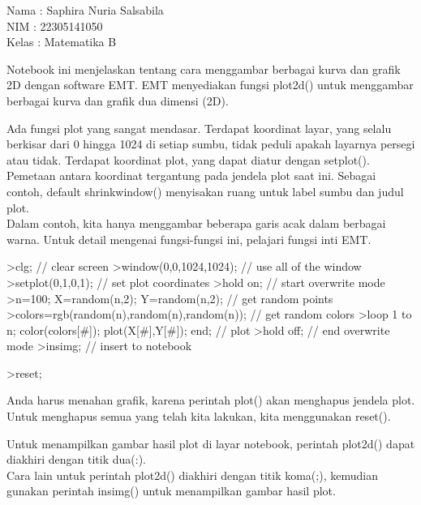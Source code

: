\documentclass{article}
\begin{document}
\begin{eulernotebook}
\begin{eulercomment}
Nama  : Saphira Nuria Salsabila\\
NIM   : 22305141050\\
Kelas : Matematika B


\begin{eulercomment}
\begin{eulercomment}
Notebook ini menjelaskan tentang cara menggambar berbagai kurva dan
grafik 2D dengan software EMT. EMT menyediakan fungsi plot2d() untuk
menggambar berbagai kurva dan grafik dua dimensi (2D).

\end{eulercomment}
\begin{eulercomment}
Ada fungsi plot yang sangat mendasar. Terdapat koordinat layar, yang
selalu berkisar dari 0 hingga 1024 di setiap sumbu, tidak peduli
apakah layarnya persegi atau tidak. Terdapat koordinat plot, yang
dapat diatur dengan setplot(). Pemetaan antara koordinat tergantung
pada jendela plot saat ini. Sebagai contoh, default shrinkwindow()
menyisakan ruang untuk label sumbu dan judul plot.\\
Dalam contoh, kita hanya menggambar beberapa garis acak dalam berbagai
warna. Untuk detail mengenai fungsi-fungsi ini, pelajari fungsi inti
EMT.
\end{eulercomment}
\begin{eulerprompt}
>clg; // clear screen
>window(0,0,1024,1024); // use all of the window
>setplot(0,1,0,1); // set plot coordinates
>hold on; // start overwrite mode
>n=100; X=random(n,2); Y=random(n,2);  // get random points
>colors=rgb(random(n),random(n),random(n)); // get random colors
>loop 1 to n; color(colors[#]); plot(X[#],Y[#]); end; // plot
>hold off; // end overwrite mode
>insimg; // insert to notebook
\end{eulerprompt}
\begin{eulerprompt}
>reset;
\end{eulerprompt}
\begin{eulercomment}
Anda harus menahan grafik, karena perintah plot() akan menghapus
jendela plot. Untuk menghapus semua yang telah kita lakukan, kita
menggunakan reset().

Untuk menampilkan gambar hasil plot di layar notebook, perintah
plot2d() dapat diakhiri dengan titik dua(:).\\
Cara lain untuk perintah plot2d() diakhiri dengan titik koma(;),
kemudian gunakan perintah insimg() untuk menampilkan gambar hasil
plot.


\end{eulercomment}
\end{eulercomment}
\end{eulercomment}
\end{eulernotebook}
\end{document}
